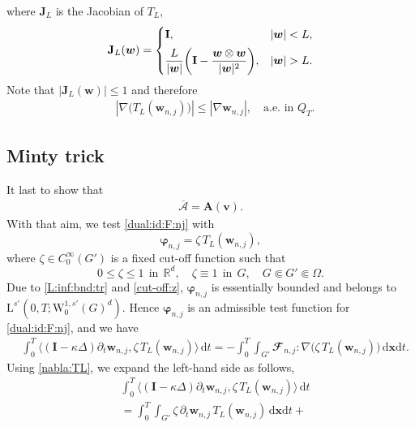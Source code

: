 \documentclass[12pt,reqno]{amsart}
\numberwithin{equation}{section}
\let\originalleft\left
\let\originalright\right
\renewcommand{\left}{\mathopen{}\mathclose\bgroup\originalleft}
\renewcommand{\right}{\aftergroup\egroup\originalright}
\theoremstyle{definition}
\def\dt{\,\mathrm{d}t}
\def\dxt{\,\mathrm{d}\boldsymbol{x}\mathrm{d}t}
\def\W{\mathrm{W}}
\def\L{\mathrm{L}}
\def\vv{\boldsymbol{v}}
\def\w{\boldsymbol{w}}
\def\bfI{\mathbf{I}}
\def\bfA{\mathbf{A}}
\def\bmcA{\boldsymbol{\mathcal{A}}}
\def\bfi{\boldsymbol{\varphi}}
\def\bcF{\mathbfcal{F}}
\begin{document}
{{{where $\mathbf{J}_L$ is the Jacobian of $T_L$,
\begin{equation}\label{Jac:J:L}
\mathbf{J}_L(\w)
=
\begin{cases}
\bfI, & |\w|<L, \\[1ex]
\dfrac{L}{|\w|}\left(
\bfI-\dfrac{\w\otimes\w}{|\w|^2}\right),
& |\w|>L.
\end{cases}
\end{equation}
Note that $|\mathbf{J}_L(\w)|\leq 1$ and therefore
\begin{align}
  & |\nabla\big(T_L(\w_{n,j})\big)|\leq |\nabla\w_{n,j}|, \quad \text{a.e.\  in\ $Q_T$}.  \label{L:inf:bnd:gr:tr}
\end{align}


\subsection{Minty trick}\label{MiT}
It last to show that
	\begin{align}\label{claim:5}
		\overline{\bmcA}=\bfA(\vv).
	\end{align}
With that aim, we test \eqref{dual:id:F:nj} with
\begin{equation*}
\bfi_{n,j}=\zeta\,T_L(\w_{n,j}),
\end{equation*}
where $\zeta \in C_0^\infty(G')$ is a fixed cut-off function such that
\begin{equation}\label{cut-off:z}
0 \leq \zeta \leq 1\ \ \text{in}\ \ \mathbb{R}^d,\quad
\zeta\equiv 1 \ \ \text{in}\ \ G,\quad G\Subset G'\Subset \Omega.
\end{equation}
Due to \eqref{L:inf:bnd:tr} and \eqref{cut-off:z}, $\bfi_{n,j}$ is essentially bounded and belongs to $\L^{s'}(0,T;\W^{1,s'}_0(G)^d)$.
Hence $\bfi_{n,j}$ is an admissible test function for \eqref{dual:id:F:nj}, and we have
\begin{equation}\label{dual_div:T:L}
\begin{split}
& \int_{0}^{T}\big\langle(\bfI-\kappa\Delta)\partial_t\w_{n,j},\zeta\,T_L(\w_{n,j})\big\rangle\dt
=
-\!\int_{0}^{T}\!\!\!\!\int_{G'}\bcF_{n,j}: \nabla\big(\zeta\, T_L(\w_{n,j})\big)\dxt.
\end{split}
\end{equation}
Using \eqref{nabla:TL}, we expand the left-hand side as follows,
\begin{equation*}
\begin{split}
& \int_{0}^{T}\big\langle(\bfI-\kappa\Delta)\partial_t\w_{n,j},\zeta\,T_L(\w_{n,j})\big\rangle\dt \\&=  \int_{0}^{T}\!\!\!\!\int_{G'}\zeta\,\partial_t\w_{n,j}\,T_L(\w_{n,j})\dxt  +

\end{split}
\end{equation*}}}}
\end{document}
